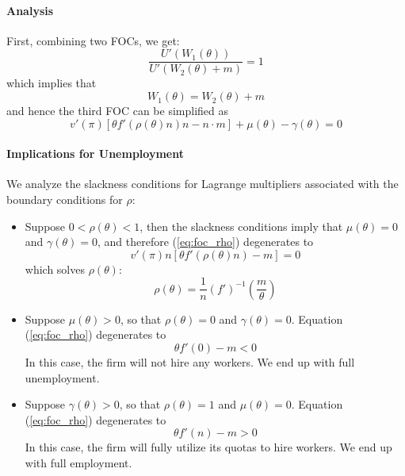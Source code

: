 \documentclass[12pt]{article}
\begin{document}
\paragraph{Analysis}

First, combining two FOCs, we get:
\begin{equation} \label{eq:risk_sharing}
	\frac{U'(W_1(\theta))}{U'(W_2(\theta) + m)} = 1
\end{equation}
which implies that
\begin{equation}
	W_1(\theta) = W_2(\theta) + m
\end{equation}
and hence the third FOC can be simplified as 
\begin{equation} \label{eq:foc_rho}
	v'(\pi) \left[\theta f'(\rho(\theta) n) n - n \cdot m\right] + \mu (\theta) - \gamma(\theta) = 0
\end{equation}

\paragraph{Implications for Unemployment \\ [6pt]}
We analyze the slackness conditions for Lagrange multipliers associated with the boundary conditions for $\rho$:
\begin{itemize}
	\item Suppose $0 < \rho(\theta) < 1$, then the slackness conditions imply that $\mu(\theta) = 0$ and $\gamma(\theta) = 0$, and therefore (\ref{eq:foc_rho}) degenerates to
	\begin{equation}
		v'(\pi) n \left[\theta f'(\rho(\theta) n) - m\right] = 0
	\end{equation}
which solves $\rho(\theta)$:
\begin{equation}
	\rho(\theta) = \frac{1}{n}(f')^{-1}\left(\frac{m}{\theta}\right)
\end{equation}
\item Suppose $\mu(\theta) > 0$, so that $\rho(\theta) = 0$ and $\gamma(\theta) = 0$. Equation (\ref{eq:foc_rho}) degenerates to
\begin{equation}
	\theta f'(0) - m < 0
\end{equation}
In this case, the firm will not hire any workers. We end up with full unemployment.
\item Suppose $\gamma(\theta)> 0$, so that $\rho(\theta) = 1$ and $\mu(\theta) = 0$. Equation (\ref{eq:foc_rho}) degenerates to 
\begin{equation}
	\theta f'(n) - m > 0
\end{equation}
In this case, the firm will fully utilize its quotas to hire workers. We end up with full employment.
\end{itemize}
\end{document}
